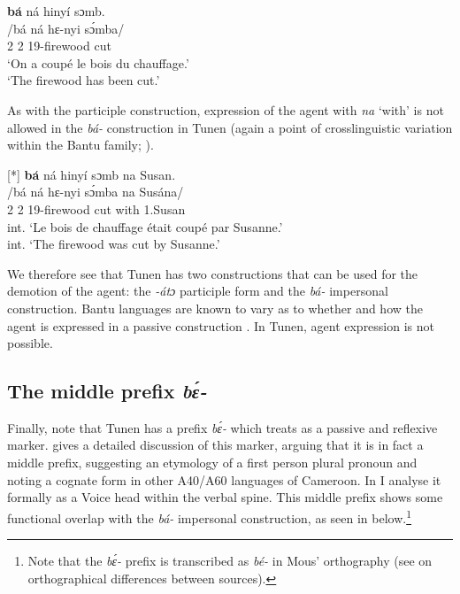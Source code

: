 \documentclass[output=paper,colorlinks,citecolor=brown
]{langscibook}
\begin{document}
\z

\ea
\glll
{\db}\textbf{ba}́ ná hinyí sɔmb. \\
/bá ná hɛ-nyi sɔ́mba/ \\
{\db}2\SM{} \PST{}2{} 19-firewood cut \\
\glt
`On a coupé le bois du chauffage.' \\ `The firewood has been cut.' \jambox*{[EE+EB 1672] }

\z

As with the participle construction, expression of the agent with \textit{na} `with' is not allowed in the \textit{bá-} construction in Tunen (again a point of crosslinguistic variation within the Bantu family; \citealt{Fleisch2005}).

\ea
[*]{
\glll
{\db}\textbf{ba}́ ná hinyí sɔmb na Susan. \\
/bá ná hɛ-nyi sɔ́mba na Susána/ \\
{\db}2\SM{} \PST{}2{} 19-firewood cut with 1.Susan \\
\glt
int. `Le bois de chauffage était coupé par Susanne.' \\ int. `The firewood was cut by Susanne.' \jambox*{[EE+EB 1674] }
}

\z


We therefore see that Tunen has two constructions that can be used for the demotion of the agent: the \textit{-átɔ} participle form and the \textit{bá-} impersonal construction. Bantu languages are known to vary as to whether and how the agent is expressed in a passive construction \citep{Fleisch2005}. In Tunen, agent expression is not possible.

\subsection{The middle prefix \textit{bɛ́-}}

Finally, note that Tunen has a prefix \textit{bɛ́-} which \citet{Dugast1971} treats as a passive and reflexive marker. \citet{Mous2008} gives a detailed discussion of this marker, arguing that it is in fact a middle prefix, suggesting an etymology of a first person plural pronoun and noting a cognate form in other A40/A60 languages of Cameroon. In \citet{KerrFut} I analyse it formally as a Voice head within the verbal spine. This middle prefix shows some functional overlap with the \textit{bá-} impersonal construction, as seen in  below.\footnote{Note that the \textit{bɛ́-} prefix is transcribed as \textit{bé-} in Mous' \citeyear{Mous2003} orthography (see \citealt[Chapter 4]{KerrFut} on orthographical differences between sources).}
\end{document}
